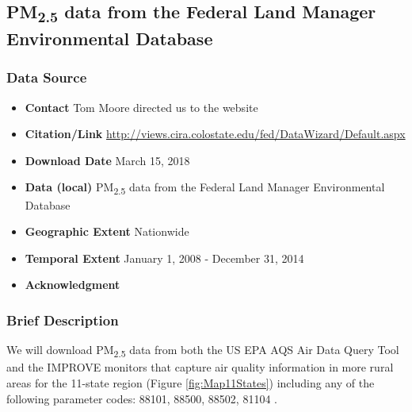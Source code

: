 \subsection{\texorpdfstring{PM\textsubscript{2.5}}{} data from the Federal Land Manager Environmental Database}

\subsubsection*{Data Source}

\begin{itemize}[nolistsep]
\item \textbf{Contact} Tom Moore directed us to the website
\item \textbf{Citation/Link} \url{http://views.cira.colostate.edu/fed/DataWizard/Default.aspx}
\item \textbf{Download Date} March 15, 2018%
\item \textbf{Data (local)} PM\textsubscript{2.5} data from the Federal Land Manager Environmental Database
\item \textbf{Geographic Extent} Nationwide
\item \textbf{Temporal Extent} January 1, 2008 - December 31, 2014
\item \textbf{Acknowledgment} 
\end{itemize}

\subsubsection*{Brief Description}

We will download PM\textsubscript{2.5} data from both the US EPA AQS Air Data Query Tool \citep{EPAAirData2017} and the IMPROVE monitors that capture air quality information in 
more rural areas \citep{EPANPM25IMPROVE2017} for the 11-state region (Figure \ref{fig:Map11States}) including any of the following parameter codes: 88101, 88500, 88502, 81104 \citep{EPANPM25Memo2017,EPANPM25Parameters2017,EPANAllParameters2017}. %

